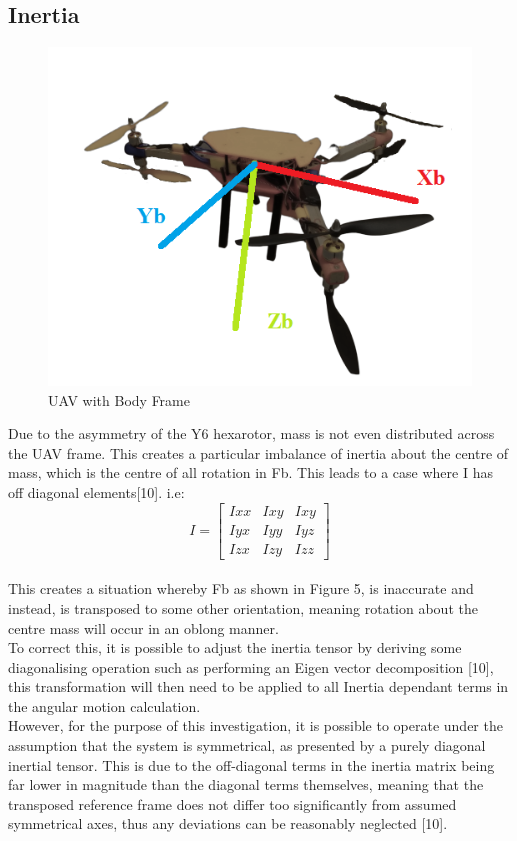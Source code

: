 \documentclass[12pt,a4paper,twoside]{report}
\begin{document}
					\subsection*{Inertia}
					
						\begin{figure}[h!]
							\centering
							\includegraphics[width=0.6\linewidth]{UAVBodyFrame.png}
							\caption{UAV with Body Frame}
							\label{fig:uavbodyframe}
						\end{figure}
						
						Due to the asymmetry of the Y6 hexarotor, mass is not even distributed across the UAV frame. This creates a particular imbalance of inertia about the centre of mass, which is the centre of all rotation in Fb. This leads to a case where I has off diagonal elements[10]. i.e:
						\\
					    $$ 
						 I = 
						 \begin{bmatrix}
							 Ixx & Ixy & Ixy \\
							 Iyx & Iyy & Iyz \\
							 Izx & Izy & Izz
						 \end{bmatrix}
						$$
						 \\
						 This creates a situation whereby Fb as shown in Figure 5, is inaccurate and instead, is transposed to some other orientation, meaning rotation about the centre mass will occur in an oblong manner.
						 \\
						 To correct this, it is possible to adjust the inertia tensor by deriving some diagonalising operation such as performing an Eigen vector decomposition [10], this transformation will then need to be applied to all Inertia dependant terms in the angular motion calculation.
						 \\  
						 However, for the purpose of this investigation, it is possible to operate under the assumption that the system is symmetrical, as presented by a purely diagonal inertial tensor. This is due to the off-diagonal terms in the inertia matrix being far lower in magnitude than the diagonal terms themselves, meaning that the transposed reference frame does not differ too significantly from assumed symmetrical axes, thus any deviations can be reasonably neglected [10].
			
\end{document}
